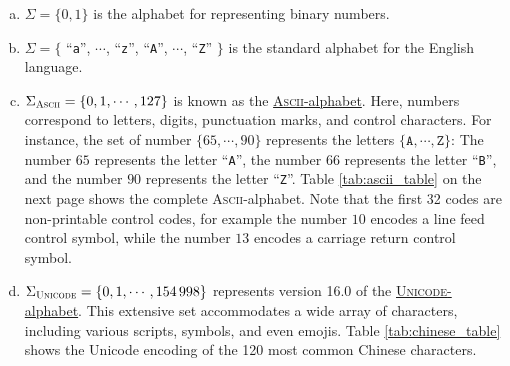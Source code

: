 \examplesEng
\begin{enumerate}[(a)]
\item \( \Sigma = \{ 0, 1 \} \) is the alphabet for representing binary numbers.
\item $\Sigma = \{$ ``\texttt{a}'', $\cdots$, ``\texttt{z}'', ``\texttt{A}'', $\cdots$, ``\texttt{Z}'' $\}$ 
      is the standard alphabet for the English language.
\item \( \Sigma_{\textsc{\scriptsize Ascii}} = \{ 0, 1, \cdots, 127 \} \) is known as the
      \href{http://en.wikipedia.org/wiki/ASCII}{\textsc{Ascii}-alphabet}.  Here,
      numbers correspond to letters, digits, punctuation marks, and control characters. For instance, the set
      of number \( \{ 65, \cdots, 90 \} \) represents the letters \( \{ \mathtt{A}, \cdots, \mathtt{Z} \} \):
      The number $65$ represents the letter ``\texttt{A}'', the number $66$ represents the letter
      ``\texttt{B}'', and the number $90$ represents the letter ``\texttt{Z}''.
      Table \ref{tab:ascii_table} on the next page shows the complete \textsc{Ascii}-alphabet.  Note that the
      first 32 codes are non-printable control codes, for example the number $10$ encodes a line feed control
      symbol, while the number $13$ encodes a carriage return control symbol.
      
\item \( \Sigma_{\textsc{\scriptsize Unicode}} = \{ 0, 1, \cdots, 154\,998 \} \) represents version 16.0 of the
      \href{https://en.wikipedia.org/wiki/Unicode}{\textsc{Unicode}-alphabet}. 
      This extensive set accommodates a wide array of characters, including various scripts, symbols, and even
      emojis.  Table \ref{tab:chinese_table} shows the Unicode encoding of the 120 most common Chinese characters.
\eox
\end{enumerate}

